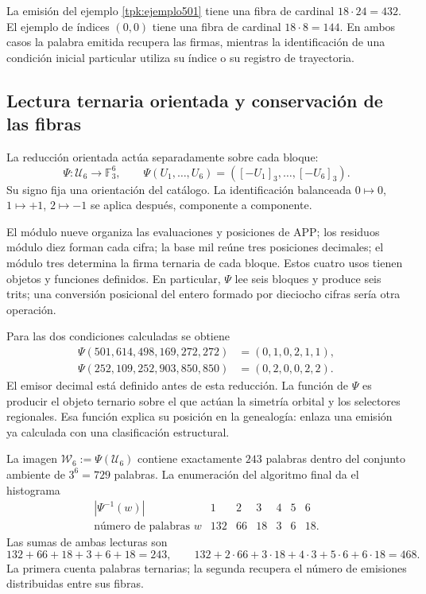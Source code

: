 La emisión del ejemplo \ref{tpk:ejemplo501} tiene una fibra de cardinal
\(18\cdot24=432\). El ejemplo de índices \((0,0)\) tiene una fibra de
cardinal \(18\cdot8=144\). En ambos casos la palabra emitida recupera
las firmas, mientras la identificación de una condición inicial particular
utiliza su índice o su registro de trayectoria.

\subsection{Lectura ternaria orientada y conservación de las fibras}
\label{tpk:reduccion-ternaria}

La reducción orientada actúa separadamente sobre cada bloque:
\begin{equation}
 \Psi:\mathcal U_6\longrightarrow\mathbb F_3^6,\qquad
 \Psi(U_1,\ldots,U_6)=([-U_1]_3,\ldots,[-U_6]_3).
 \label{tpk:psi}
\end{equation}
Su signo fija una orientación del catálogo. La identificación balanceada
\(0\mapsto0\), \(1\mapsto+1\), \(2\mapsto-1\) se aplica después,
componente a componente.

El módulo nueve organiza las evaluaciones y posiciones de APP; los residuos
módulo diez forman cada cifra; la base mil reúne tres posiciones decimales;
el módulo tres determina la firma ternaria de cada bloque. Estos cuatro usos
tienen objetos y funciones definidos. En particular, \(\Psi\) lee seis
bloques y produce seis trits; una conversión posicional del entero formado
por dieciocho cifras sería otra operación.

Para las dos condiciones calculadas se obtiene
\begin{align*}
 \Psi(501,614,498,169,272,272)&=(0,1,0,2,1,1),\\
 \Psi(252,109,252,903,850,850)&=(0,2,0,0,2,2).
\end{align*}
El emisor decimal está definido antes de esta reducción. La función de
\(\Psi\) es producir el objeto ternario sobre el que actúan la simetría
orbital y los selectores regionales. Esa función explica su posición en la
genealogía: enlaza una emisión ya calculada con una clasificación estructural.

La imagen \(\mathcal W_6:=\Psi(\mathcal U_6)\) contiene exactamente
\(243\) palabras dentro del conjunto ambiente de \(3^6=729\) palabras.
La enumeración del algoritmo final da el histograma
\begin{equation}
\begin{array}{c|rrrrrr}
 |\Psi^{-1}(w)|&1&2&3&4&5&6\\\hline
 \text{número de palabras }w&132&66&18&3&6&18.
\end{array}
\label{tpk:fibras-ternarias}
\end{equation}
Las sumas de ambas lecturas son
\[
132+66+18+3+6+18=243,
\qquad132+2\cdot66+3\cdot18+4\cdot3+5\cdot6+6\cdot18=468.
\]
La primera cuenta palabras ternarias; la segunda recupera el número de
emisiones distribuidas entre sus fibras.

